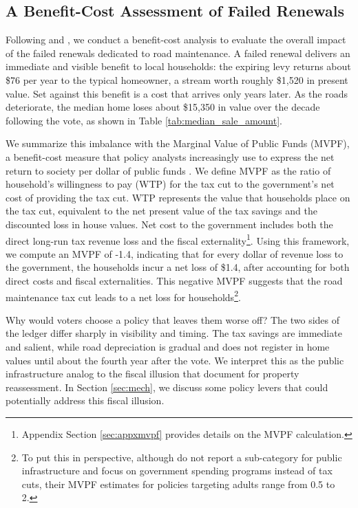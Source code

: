 \subsection{A Benefit-Cost Assessment of Failed Renewals} \label{sec:mvpf}

Following \cite{hendren2020unified} and \cite{finkelstein2020welfare}, we conduct a benefit-cost analysis to evaluate the overall impact of the failed renewals dedicated to road maintenance. A failed renewal delivers an immediate and visible benefit to local households: the expiring levy returns about \$76 per year to the typical homeowner, a stream worth roughly \$1,520 in present value. Set against this benefit is a cost that arrives only years later. As the roads deteriorate, the median home loses about \$15,350 in value over the decade following the vote, as shown in Table \ref{tab:median_sale_amount}. 

We summarize this imbalance with the Marginal Value of Public Funds (MVPF), a benefit-cost measure that policy analysts increasingly use to express the net return to society per dollar of public funds \citep{hendren2020unified}. We define MVPF as the ratio of household's willingness to pay (WTP) for the tax cut to the government's net cost of providing the tax cut. WTP represents the value that households place on the tax cut, equivalent to the net present value of the tax savings and the discounted loss in house values. Net cost to the government includes both the direct long-run tax revenue loss and the fiscal externality\footnote{Appendix Section \ref{sec:appxmvpf} provides details on the MVPF calculation.}. Using this framework, we compute an MVPF of -1.4, indicating that for every dollar of revenue loss to the government, the households incur a net loss of \$1.4, after accounting for both direct costs and fiscal externalities. This negative MVPF suggests that the road maintenance tax cut leads to a net loss for households\footnote{To put this in perspective, although \cite{hendren2020unified} do not report a sub-category for public infrastructure and focus on government spending programs instead of tax cuts, their MVPF estimates for policies targeting adults range from 0.5 to 2.}.

Why would voters choose a policy that leaves them worse off? The two sides of the ledger differ sharply in visibility and timing. The tax savings are immediate and salient, while road depreciation is gradual and does not register in home values until about the fourth year after the vote. 
We interpret this as the public infrastructure analog to the fiscal illusion that \citet{ross2013fiscal} document for property reassessment.
In Section \ref{sec:mech}, we discuss some policy levers that could potentially address this fiscal illusion.
